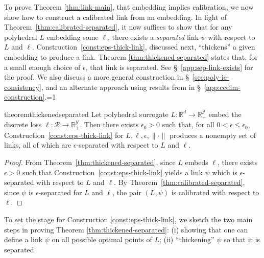 \documentclass[twoside,11pt]{article}
\newcommand{\Comments}{1}
\newcommand{\mytodo}[2]{\ifnum\Comments=1%
  \todo[linecolor=#1!80!black,backgroundcolor=#1,bordercolor=#1!80!black]{#2}\fi}
\newcommand{\raft}[1]{\mytodo{green!20!white}{RF: #1}}
\newcommand{\reals}{\mathbb{R}}
\newcommand{\R}{\mathcal{R}}
\newcommand{\Y}{\mathcal{Y}}
\begin{document}
To prove Theorem \ref{thm:link-main}, that embedding implies calibration, we now show how to construct a calibrated link from an embedding.
In light of Theorem~\ref{thm:calibrated-separated}, it now suffices to show that for any polyhedral $L$ embedding some $\ell$, there exists a \emph{separated} link $\psi$ with respect to $L$ and $\ell$.
Construction~\ref{const:eps-thick-link}, discussed next, ``thickens'' a given embedding to produce a link.
Theorem \ref{thm:thickened-separated} states that, for a small enough choice of $\epsilon$, that link is separated.
See \S~\ref{app:sep-link-exists} for the proof.
We also discuss a more general construction in \S~\ref{sec:poly-ie-consistency}, and an alternate approach using results from \citet{ramaswamy2016convex} in \S~\ref{app:ccdim-construction}.\raft{Added}
\begin{restatable}{theorem}{thickenedseparated} \label{thm:thickened-separated}
  Let polyhedral surrogate $L:\reals^d \to \reals^\Y_+$ embed the discrete loss $\ell:\R\to\reals^\Y_+$.
  Then there exists $\epsilon_0 > 0$ such that, for all $0 < \epsilon \leq \epsilon_0$, Construction~\ref{const:eps-thick-link} for $L,\ell,\epsilon,\|\cdot\|$ produces a nonempty set of links, all of which are $\epsilon$-separated with respect to $L$ and $\ell$.
\end{restatable}

\linkinformal*
\begin{proof}
	From Theorem~\ref{thm:thickened-separated}, since $L$ embeds $\ell$, there exists $\epsilon>0$ such that Construction~\ref{const:eps-thick-link} yields a link $\psi$ which is $\epsilon$-separated with respect to $L$ and $\ell$.
	By Theorem~\ref{thm:calibrated-separated}, since $\psi$ is $\epsilon$-separated for $L$ and $\ell$, the pair $(L,\psi)$ is calibrated with respect to $\ell$.
\end{proof}

To set the stage for Construction \ref{const:eps-thick-link}, we sketch the two main steps in proving Theorem \ref{thm:thickened-separated}: (i) showing that one can define a link $\psi$ on all possible optimal points of $L$; (ii) ``thickening'' $\psi$ so that it is separated.
\end{document}
